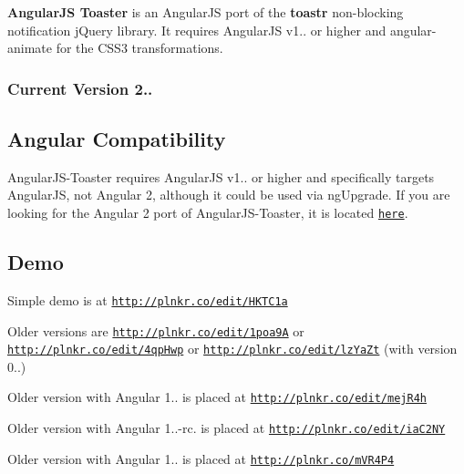 {\bfseries Angular\+JS Toaster} is an Angular\+JS port of the {\bfseries toastr} non-\/blocking notification j\+Query library. It requires Angular\+JS v1.. or higher and angular-\/animate for the C\+S\+S3 transformations.

\href{https://travis-ci.org/jirikavi/AngularJS-Toaster}{\tt } \href{https://coveralls.io/github/jirikavi/AngularJS-Toaster?branch=master}{\tt }

\subsubsection*{Current Version 2..}

\subsection*{Angular Compatibility}

Angular\+J\+S-\/\+Toaster requires Angular\+JS v1.. or higher and specifically targets Angular\+JS, not Angular 2, although it could be used via ng\+Upgrade. If you are looking for the Angular 2 port of Angular\+J\+S-\/\+Toaster, it is located \href{https://github.com/Stabzs/Angular2-Toaster}{\tt here}.

\subsection*{Demo}


\begin{DoxyItemize}
\item Simple demo is at \href{http://plnkr.co/edit/HKTC1a}{\tt http\+://plnkr.\+co/edit/\+H\+K\+T\+C1a}
\item Older versions are \href{http://plnkr.co/edit/1poa9A}{\tt http\+://plnkr.\+co/edit/1poa9A} or \href{http://plnkr.co/edit/4qpHwp}{\tt http\+://plnkr.\+co/edit/4qp\+Hwp} or \href{http://plnkr.co/edit/lzYaZt}{\tt http\+://plnkr.\+co/edit/lz\+Ya\+Zt} (with version 0..)
\item Older version with Angular 1.. is placed at \href{http://plnkr.co/edit/mejR4h}{\tt http\+://plnkr.\+co/edit/mej\+R4h}
\item Older version with Angular 1..-\/rc. is placed at \href{http://plnkr.co/edit/iaC2NY}{\tt http\+://plnkr.\+co/edit/ia\+C2\+NY}
\item Older version with Angular 1.. is placed at \href{http://plnkr.co/mVR4P4}{\tt http\+://plnkr.\+co/m\+V\+R4\+P4}
\end{DoxyItemize}

